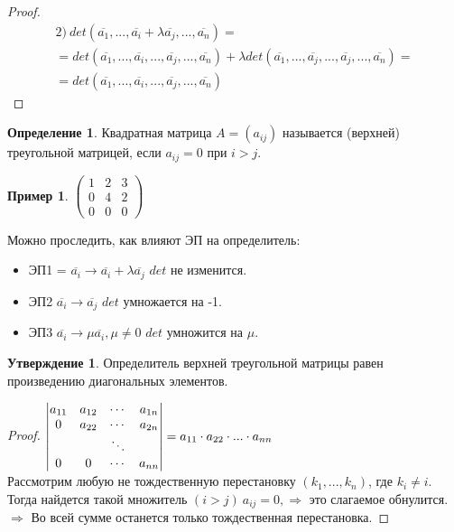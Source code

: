 \documentclass[a4paper, 12pt]{article}
\newcommand\tab[1][.5cm]{\hspace*{#1}}
\theoremstyle{definition}
\newtheorem*{definition}{Определение}
\newtheorem*{subtheorem}{Утверждение}
\newtheorem*{example1}{Пример}
\begin{document}
  \begin{proof} \tab
    \begin{multline*}
      2) \ det(\overline{a_1},...,\overline{a_i}+\lambda \overline{a_j},...,\overline{a_n}) = \\ = det(\overline{a_1},...,\overline{a_i},...,\overline{a_j},...,\overline{a_n}) + \lambda det(\overline{a_1},...,\overline{a_j},...,\overline{a_j},...,\overline{a_n}) = \\ = det(\overline{a_1},...,\overline{a_i},...,\overline{a_j},...,\overline{a_n})
    \end{multline*}
  \end{proof} 
  \begin{definition}
    Квадратная матрица $A = (a_{ij})$ называется (верхней) треугольной матрицей, если $a_{ij} = 0$ при $i>j$. 
    \begin{example1}
      $\begin{pmatrix}
        1 & 2 & 3 \\ 0 & 4 & 2 \\ 0 & 0& 0
      \end{pmatrix}$
    \end{example1}  
  \end{definition} 
  Можно проследить, как влияют ЭП на определитель:
  \begin{itemize}
    \item ЭП1 = $\overline{a_i} \to \overline{a_i} + \lambda \overline{a_j}$ \tab[0.3cm] $det$ не изменится. 
    \item ЭП2 $\overline{a_i} \to \overline{a_j}$ \tab[2.15cm] $det$ умножается на -1. 
    \item ЭП3 $\overline{a_i} \to \mu \overline{a_i}, \mu \not = 0$ \tab[0.45cm] $det$ умножится на $\mu$. 
  \end{itemize}
  \begin{subtheorem}
    Определитель верхней треугольной матрицы равен произведению диагональных элементов.
  \end{subtheorem} 
  \begin{proof}
    $\begin{vmatrix}
      a_{11} & a_{12} & \cdots & a_{1n} \\
      0 & a_{22} & \cdots & a_{2n} \\
      \null & \null & \ddots & \null \\
      0 & 0 & \cdots & a_{nn} 
    \end{vmatrix} = a_{11}\cdot a_{22}\cdot...\cdot a_{nn}$ \\
    Рассмотрим любую не тождественную перестановку $(k_1,...,k_n)$, где $k_i \not = i$. Тогда найдется такой множитель $(i>j) \ a_{ij} = 0,  \Longrightarrow $ это слагаемое обнулится. $\Longrightarrow $ Во всей сумме останется только тождественная перестановка. 
  \end{proof} 
\end{document}
